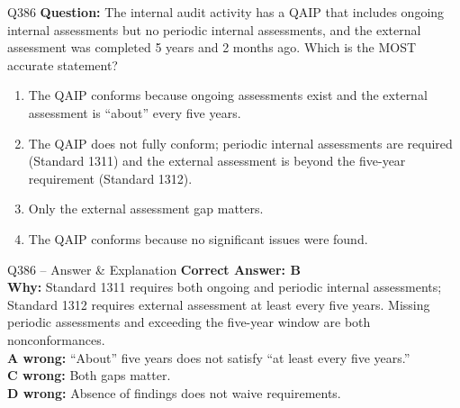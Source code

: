 \documentclass[aspectratio=169,10pt]{beamer}
\begin{document}
	\begin{frame}[t]{Q386}
		\small
		\textbf{Question:} The internal audit activity has a QAIP that includes ongoing internal assessments but no periodic internal assessments, and the external assessment was completed 5 years and 2 months ago. Which is the MOST accurate statement?
		\begin{enumerate}[label=\Alph*.,itemsep=1pt,topsep=2pt]
			\item The QAIP conforms because ongoing assessments exist and the external assessment is ``about'' every five years.
			\item The QAIP does not fully conform; periodic internal assessments are required (Standard 1311) and the external assessment is beyond the five-year requirement (Standard 1312).
			\item Only the external assessment gap matters.
			\item The QAIP conforms because no significant issues were found.
		\end{enumerate}
	\end{frame}
	
	\begin{frame}[t]{Q386 -- Answer \& Explanation}
		\small
		\textbf{Correct Answer: B} \\[4pt]
		\textbf{Why:} Standard 1311 requires both ongoing and periodic internal assessments; Standard 1312 requires external assessment at least every five years. Missing periodic assessments and exceeding the five-year window are both nonconformances. \\[4pt]
		\textbf{A wrong:} ``About'' five years does not satisfy ``at least every five years.'' \\[2pt]
		\textbf{C wrong:} Both gaps matter. \\[2pt]
		\textbf{D wrong:} Absence of findings does not waive requirements.
	\end{frame}
	
\end{document}
